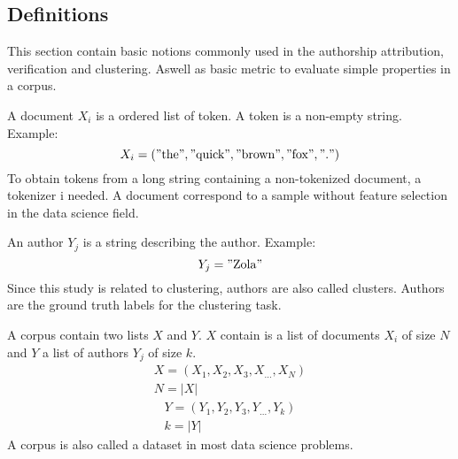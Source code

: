 \subsection{Definitions \label{sec:basic_notions}}

This section contain basic notions commonly used in the authorship attribution, verification and clustering.
Aswell as basic metric to evaluate simple properties in a corpus.

\begin{definition}[Document]
  A document $X_i$ is a ordered list of token. A token is a non-empty string. Example:
  \begin{equation}
    X_i = ("\text{the}", "\text{quick}", "\text{brown}", "\text{fox}", "\text{.}")
  \end{equation}
  To obtain tokens from a long string containing a non-tokenized document, a tokenizer i needed.
  A document correspond to a sample without feature selection in the data science field.
\end{definition}

\begin{definition}[Author]
  An author $Y_j$ is a string describing the author. Example:
  \begin{equation}
    Y_j = "\text{Zola}"
  \end{equation}
  Since this study is related to clustering, authors are also called clusters.
  Authors are the ground truth labels for the clustering task.
\end{definition}

\begin{definition}[Corpus]
  A corpus contain two lists $X$ and $Y$.
  $X$ contain is a list of documents $X_i$ of size $N$ and $Y$ a list of authors $Y_j$ of size $k$.
  \begin{gather}
    X = (X_1, X_2, X_3, X_{...}, X_N) \\
    N = |X|
  \end{gather}
  \begin{gather}
    Y = (Y_1, Y_2, Y_3, Y_{...}, Y_k) \\
    k = |Y|
  \end{gather}
  A corpus is also called a dataset in most data science problems.
\end{definition}

